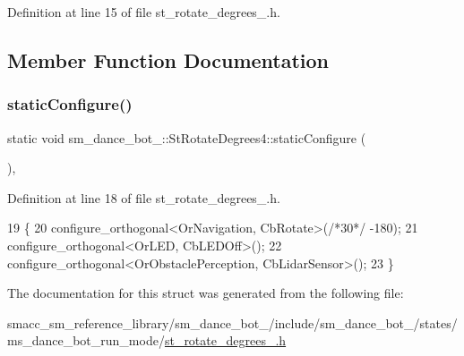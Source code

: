 Definition at line 15 of file st\+\_\+rotate\+\_\+degrees\+\_.\+h.



\subsection{Member Function Documentation}
\mbox{\label{structsm__dance__bot__2_1_1StRotateDegrees4_a553d00b558b39dc3dfa5e670bd7ee30a}} 
\subsubsection{\texorpdfstring{static\+Configure()}{staticConfigure()}}
{\footnotesize\ttfamily static void sm\+\_\+dance\+\_\+bot\+\_\+::\+St\+Rotate\+Degrees4\+::static\+Configure (\begin{DoxyParamCaption}{ }\end{DoxyParamCaption})\hspace{0.3cm}{\ttfamily [inline]}, {\ttfamily [static]}}



Definition at line 18 of file st\+\_\+rotate\+\_\+degrees\+\_.\+h.


\begin{DoxyCode}
19   \{
20     configure\_orthogonal<OrNavigation, CbRotate>(\textcolor{comment}{/*30*/} -180);
21     configure\_orthogonal<OrLED, CbLEDOff>();
22     configure\_orthogonal<OrObstaclePerception, CbLidarSensor>();
23   \}
\end{DoxyCode}


The documentation for this struct was generated from the following file\+:\begin{DoxyCompactItemize}
\item 
smacc\+\_\+sm\+\_\+reference\+\_\+library/sm\+\_\+dance\+\_\+bot\+\_/include/sm\+\_\+dance\+\_\+bot\+\_/states/ms\+\_\+dance\+\_\+bot\+\_\+run\+\_\+mode/\hyperlink{2_2include_2sm__dance__bot__2_2states_2ms__dance__bot__run__mode_2st__rotate__degrees__4_8h}{st\+\_\+rotate\+\_\+degrees\+\_.\+h}\end{DoxyCompactItemize}
